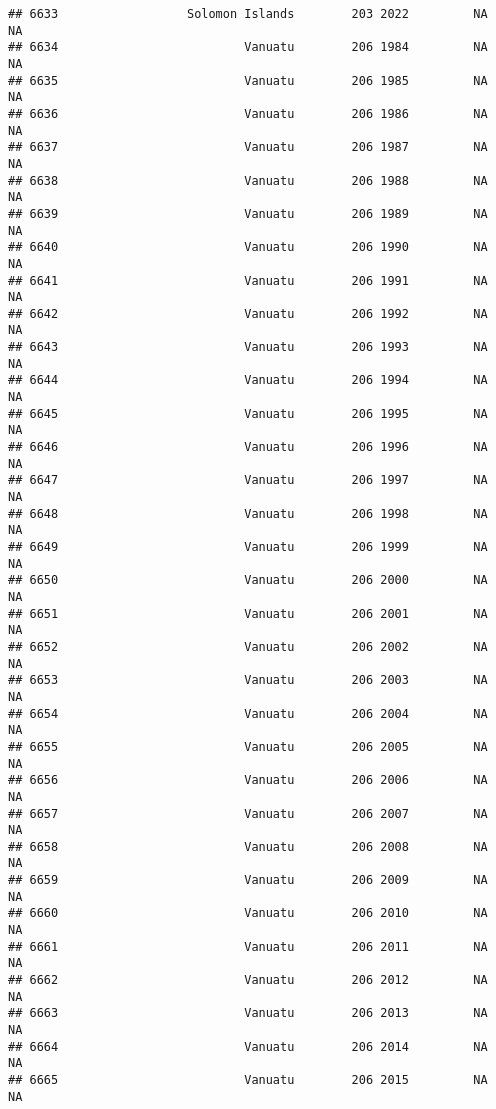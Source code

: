 \documentclass[
]{article}
\begin{document}
\begin{verbatim}
## 6633                  Solomon Islands        203 2022         NA         NA
## 6634                          Vanuatu        206 1984         NA         NA
## 6635                          Vanuatu        206 1985         NA         NA
## 6636                          Vanuatu        206 1986         NA         NA
## 6637                          Vanuatu        206 1987         NA         NA
## 6638                          Vanuatu        206 1988         NA         NA
## 6639                          Vanuatu        206 1989         NA         NA
## 6640                          Vanuatu        206 1990         NA         NA
## 6641                          Vanuatu        206 1991         NA         NA
## 6642                          Vanuatu        206 1992         NA         NA
## 6643                          Vanuatu        206 1993         NA         NA
## 6644                          Vanuatu        206 1994         NA         NA
## 6645                          Vanuatu        206 1995         NA         NA
## 6646                          Vanuatu        206 1996         NA         NA
## 6647                          Vanuatu        206 1997         NA         NA
## 6648                          Vanuatu        206 1998         NA         NA
## 6649                          Vanuatu        206 1999         NA         NA
## 6650                          Vanuatu        206 2000         NA         NA
## 6651                          Vanuatu        206 2001         NA         NA
## 6652                          Vanuatu        206 2002         NA         NA
## 6653                          Vanuatu        206 2003         NA         NA
## 6654                          Vanuatu        206 2004         NA         NA
## 6655                          Vanuatu        206 2005         NA         NA
## 6656                          Vanuatu        206 2006         NA         NA
## 6657                          Vanuatu        206 2007         NA         NA
## 6658                          Vanuatu        206 2008         NA         NA
## 6659                          Vanuatu        206 2009         NA         NA
## 6660                          Vanuatu        206 2010         NA         NA
## 6661                          Vanuatu        206 2011         NA         NA
## 6662                          Vanuatu        206 2012         NA         NA
## 6663                          Vanuatu        206 2013         NA         NA
## 6664                          Vanuatu        206 2014         NA         NA
## 6665                          Vanuatu        206 2015         NA         NA

\end{verbatim}
\end{document}
